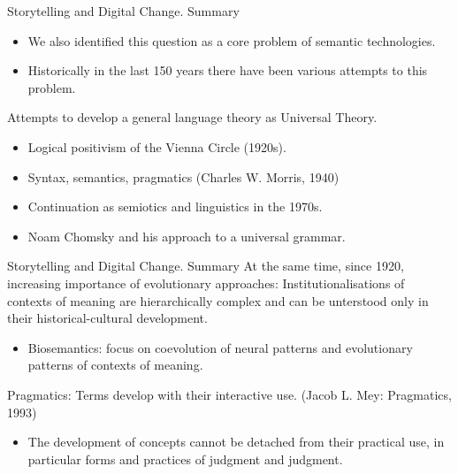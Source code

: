 \documentclass{beamer}
\begin{document}
\begin{frame}{Storytelling and Digital Change. Summary}
\begin{itemize}
\item We also identified this question as a core problem of semantic
  technologies.
\item Historically in the last 150 years there have been various attempts to
  this problem.
\end{itemize}

Attempts to develop a general language theory as Universal Theory.
\begin{itemize}
\item Logical positivism of the Vienna Circle (1920s).
\item Syntax, semantics, pragmatics (Charles W. Morris, 1940)
\item Continuation as semiotics and linguistics in the 1970s.
\item Noam Chomsky and his approach to a universal grammar.
\end{itemize}
\end{frame}

\begin{frame}{Storytelling and Digital Change. Summary}
At the same time, since 1920, increasing importance of evolutionary
approaches: Institutionalisations of contexts of meaning are hierarchically
complex and can be unterstood only in their historical-cultural development.
\begin{itemize}
\item Biosemantics: focus on coevolution of neural patterns and evolutionary
  patterns of contexts of meaning.
\end{itemize}
Pragmatics: Terms develop with their interactive use.  (Jacob L. Mey:
Pragmatics, 1993)
\begin{itemize}
\item The development of concepts cannot be detached from their practical use,
  in particular forms and practices of judgment and judgment.
\end{itemize}
\end{frame}
\end{document}
